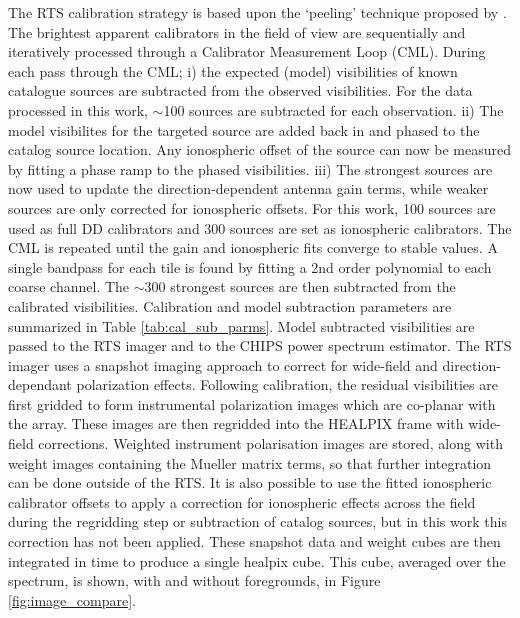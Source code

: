 \documentclass[preprint2]{aastex}
\begin{document}
The RTS calibration strategy is based upon the `peeling' technique proposed by \cite{Noordam:2004p2379}. The brightest apparent calibrators in the field of view are sequentially and iteratively processed through a Calibrator Measurement Loop (CML). During each pass through the CML; i) the expected (model) visibilities of known catalogue sources are subtracted from the observed visibilities. For the data processed in this work, $\sim$100 sources are subtracted for each observation. ii) The model visibilites for the targeted source are added back in and phased to the catalog source location. Any ionospheric offset of the source can now be measured by fitting a phase ramp to the phased visibilities. iii) The strongest sources are now used to update the direction-dependent antenna gain terms, while weaker sources are only corrected for ionospheric offsets. For this work, 100 sources are used as full DD calibrators and 300 sources are set as ionospheric calibrators. The CML is repeated until the gain and ionospheric fits converge to stable values. A single bandpass for each tile is found by fitting a 2nd order polynomial to each coarse channel. The $\sim$300 strongest sources are then subtracted from the calibrated visibilities.   Calibration and model subtraction parameters are summarized in Table \ref{tab:cal_sub_parms}.  Model subtracted visibilities are passed to the RTS imager and to the CHIPS power spectrum estimator. %
The RTS imager uses a snapshot imaging approach to correct for wide-field and direction-dependant polarization effects. Following calibration, the residual visibilities are first gridded to form instrumental polarization images which are co-planar with the array. These images are then regridded into the HEALPIX \citep{Gorski:2005p7667} frame with wide-field corrections.  Weighted instrument polarisation images are stored, along with weight images containing the Mueller matrix terms, so that further integration can be done outside of the RTS. It is also possible to use the fitted ionospheric calibrator offsets to apply a correction for ionospheric effects across the field during the regridding step or subtraction of catalog sources, but in this work this correction has not been applied. These snapshot data and weight cubes are then integrated in time to produce a single healpix cube. This cube, averaged over the spectrum, is shown, with and without foregrounds, in Figure \ref{fig:image_compare}.
\end{document}
